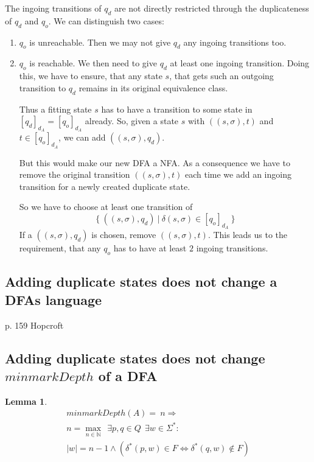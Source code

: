 \documentclass[a4paper, oneside, 11pt]{report}
\newtheorem{lemma}{Lemma}
\theoremstyle{definition}
\theoremstyle{remark}
\begin{document}
The ingoing transitions of $q_d$ are not directly restricted through the duplicateness of $q_d$ and $q_o$. We can distinguish two cases:
\begin{enumerate}
	\item $q_o$ is unreachable. Then we may not give $q_d$ any ingoing transitions too.
	
	\item $q_o$ is reachable. We then need to give $q_d$ at least one ingoing transition. Doing this, we have to ensure, that any state $s$, that gets such an outgoing transition to $q_d$ remains in its original equivalence class.
	
	Thus a fitting state $s$ has to have a transition to some state in $[q_d]_{d_A} = [q_o]_{d_A}$ already. So, given a state $s$ with $((s, \sigma), t)$ and $t \in [q_o]_{d_A}$, we can add $((s, \sigma), q_d)$.
	
	But this would make our new DFA a NFA. As a consequence we have to remove the original transition $((s, \sigma), t)$ each time we add an ingoing transition for a newly created duplicate state.
	
	So we have to choose at least one transition of
	\[
	\{\ ((s, \sigma), q_d)\ |\ \delta(s,\sigma) \in [q_o]_{d_A}\ \}
	\]
	If a $((s, \sigma), q_d)$ is chosen, remove $((s, \sigma), t)$. This leads us to the requirement, that any $q_o$ has to have at least $2$ ingoing transitions.
\end{enumerate}

\subsection{Adding duplicate states does not change a DFAs language}

p. 159 Hopcroft

\subsection{Adding duplicate states does not change $minmarkDepth$ of a DFA}

\begin{lemma}
	\begin{multline*}
	minmarkDepth(A) =\ n \Rightarrow \\
	n = \max_{n \in \mathbb{N}}\ \ \exists p, q \in Q\ \ \exists w \in \Sigma^* \colon \\
	|w| = n - 1 \land (\delta^*(p,w) \in F \Leftrightarrow \delta^*(q,w) \notin F)
	\end{multline*}
\end{lemma}
\end{document}
